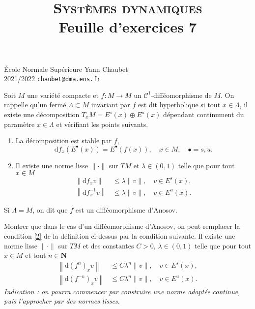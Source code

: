 \documentclass[a4paper,10pt,openany]{article}
\title{\textsc{Syst\`emes dynamiques} \\ Feuille d'exercices 7}
\date{}
\author{}
\theoremstyle{plain}
\theoremstyle{definition}
\newcommand{\dd}{\mathrm{d}}
\newcommand{\N}{\mathbf{N}}
\begin{document}
{\noindent \'Ecole Normale Sup\'erieure  \hfill Yann Chaubet } \\
{2021/2022 \hfill \texttt{chaubet@dma.ens.fr}}

{\let\newpage\relax\maketitle}
\maketitle

\noindent Soit $M$ une vari\'et\'e compacte et $f : M \to M$ un $\mathcal{C}^1$-diff\'eomorphisme de $M$. On rappelle qu'un ferm\'e $\Lambda \subset M$ invariant par $f$ est dit hyperbolique si tout $x \in \Lambda$, il existe une d\'ecomposition $T_xM = E^s(x) \oplus E^u(x)$ d\'ependant continument du param\`etre $x \in \Lambda$ et v\'erifiant les points suivants.

\begin{enumerate}
\item La d\'ecomposition est stable par $f$,
$$
\dd f_x(E^\bullet(x)) = E^\bullet(f(x)), \quad x \in M, \quad \bullet = s,u.
$$
\item \label{2} Il existe une norme lisse $\|\cdot\|$ sur $TM$ et $\lambda \in (0,1)$ telle que pour tout $x \in M$
$$
\begin{aligned}
\left \| \dd f_x v \right\| &\leq \lambda \| v \|, \quad v \in E^s(x), \\
\left \| \dd f^{-1}_x v \right\| &\leq \lambda \| v \|, \quad v \in E^u(x).
\end{aligned}
$$
\end{enumerate}
Si $\Lambda = M$, on dit que $f$ est un diff\'eomorphisme d'Anosov.

\vspace{0.6cm}

 \vspace{1.5mm} 

\noindent Montrer que dans le cas d'un diff\'eomorphisme d'Anosov, on peut remplacer la condition \ref{2} de la d\'efinition ci-dessus par la condition suivante. Il existe une norme lisse $\|\cdot\|$ sur $TM$ et des constantes $C > 0$, $\lambda \in (0,1)$ telle que pour tout $x \in M$ et tout $n \in \N$
$$
\begin{aligned}
\left \| \dd (f^n)_x v \right\| &\leq C \lambda^n \| v \|, \quad v \in E^s(x), \\
\left \| \dd (f^{-n})_x v \right\| &\leq C\lambda^n \| v \|, \quad v \in E^u(x).
\end{aligned}
$$
\textit{Indication : on pourra commencer par construire une norme adapt\'ee continue, puis l'approcher par des normes lisses.}
\vspace{0.6cm}
\end{document}
